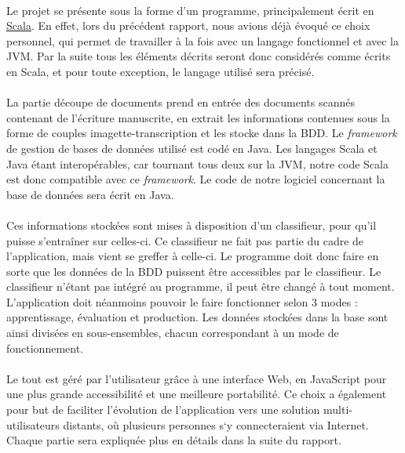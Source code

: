 \paragraph{}
Le projet se présente sous la forme d’un programme, principalement écrit en
\href{http://scala-lang.org}{Scala}. En effet, lors du précédent rapport,
nous avions déjà évoqué ce choix personnel, qui permet de travailler à la
fois avec un langage fonctionnel et avec la JVM. Par la suite tous les éléments
décrits seront donc considérés comme écrits en Scala, et pour toute exception,
le langage utilisé sera précisé.

\paragraph{}

La partie découpe de documents prend en entrée des documents scannés contenant
de l’écriture manuscrite, en extrait les informations contenues sous la forme
de couples imagette-transcription et les stocke dans la BDD. Le
\textit{framework} de gestion de bases de données utilisé est codé en Java.
Les langages Scala et Java étant interopérables, car tournant tous deux sur la
JVM, notre code Scala est donc compatible avec ce \textit{framework}. Le code
de notre logiciel concernant la base de données sera écrit en Java.

\paragraph{}
Ces informations stockées sont mises à disposition d’un classifieur, pour qu’il
puisse s'entraîner sur celles-ci. Ce classifieur ne fait pas partie du cadre de
l’application, mais vient se greffer à celle-ci. Le programme doit donc faire
en sorte que les données de la BDD puissent être accessibles par le classifieur.
Le classifieur n’étant pas intégré au programme, il peut être changé à tout
moment. L’application doit néanmoins pouvoir le faire fonctionner selon 3 modes :
apprentissage, évaluation et production. Les données stockées dans la base sont
ainsi divisées en sous-ensembles, chacun correspondant à un mode de
fonctionnement.

\paragraph{}
Le tout est géré par l’utilisateur grâce à une interface Web, en JavaScript
pour une plus grande accessibilité et une meilleure portabilité. Ce choix a
également pour but de faciliter l’évolution de l’application vers une solution
multi-utilisateurs distants, où plusieurs personnes s‘y connecteraient via
Internet. Chaque partie sera expliquée plus en détails dans la suite du rapport.

